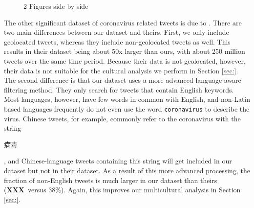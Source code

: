 \documentclass[11pt]{article}
\newcommand{\XXX}{\textbf{XXX}~}
\begin{document}
\begin{figure}%
    \centering
    \label{adsad}
    \caption{2 Figures side by side}%
    \label{fig:example}%
\end{figure}


The other significant dataset of coronavirus related tweets is due to \citet{chen2020tracking}.
There are two main differences between our dataset and theirs.
First, we only include geolocated tweets,
whereas they include non-geolocated tweets as well.
This results in their dataset being about 50x larger than ours,
with about 250 million tweets over the same time period.
Because their data is not geolocated, however, their data is not suitable for the cultural analysis we perform in Section \ref{sec:}.
The second difference is that our dataset uses a more advanced language-aware filtering method.
They only search for tweets that contain English keywords.
Most languages, however, have few words in common with English,
and non-Latin based languages frequently do not even use the word \texttt{coronavirus} to describe the virus.
Chinese tweets, for example, commonly refer to the coronavirus with the string
\begin{CJK}{UTF8}{gbsn}
病毒
\end{CJK},
and Chinese-language tweets containing this string will get included in our dataset but not in their dataset.
As a result of this more advanced processing, the fraction of non-English tweets is much larger in our dataset than theirs (\XXX versus 38\%).
Again, this improves our multicultural analysis in Section \ref{sec:}.
\end{document}
